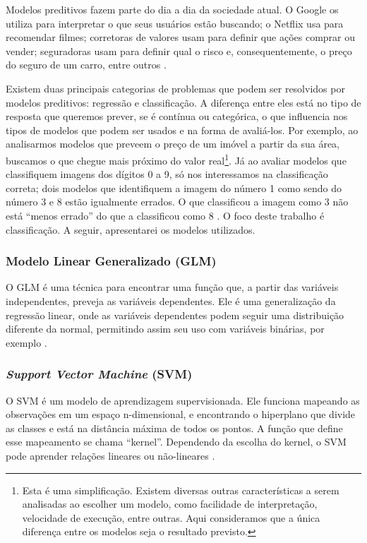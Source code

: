 \documentclass[a4paper,titlepage]{ppgi}\usepackage[]{graphicx}\usepackage[]{color}
\begin{document}
Modelos preditivos fazem parte do dia a dia da sociedade atual. O Google os
utiliza para interpretar o que seus usuários estão buscando; o Netflix usa para
recomendar filmes; corretoras de valores usam para definir que ações comprar ou
vender; seguradoras usam para definir qual o risco e, consequentemente, o preço
do seguro de um carro, entre outros \cite{Levy2010}.

Existem duas principais categorias de problemas que podem ser resolvidos por
modelos preditivos: regressão e classificação. A diferença entre eles está no
tipo de resposta que queremos prever, se é contínua ou categórica, o que
influencia nos tipos de modelos que podem ser usados e na forma de avaliá-los.
Por exemplo, ao analisarmos modelos que preveem o preço de um imóvel a partir
da sua área, buscamos o que chegue mais próximo do valor real\footnote{Esta é
uma simplificação. Existem diversas outras características a serem analisadas
ao escolher um modelo, como facilidade de interpretação, velocidade de
execução, entre outras. Aqui consideramos que a única diferença entre os
modelos seja o resultado previsto.}. Já ao avaliar modelos que classifiquem
imagens dos dígitos 0 a 9, só nos interessamos na classificação correta; dois
modelos que identifiquem a imagem do número 1 como sendo do número 3 e 8 estão
igualmente errados. O que classificou a imagem como 3 não está ``menos errado''
do que a classificou como 8 \cite{Kuhn2013,Zumel2014}. O foco deste trabalho é
classificação. A seguir, apresentarei os modelos utilizados.

\subsubsection{Modelo Linear Generalizado (GLM)}

O \gls{GLM} é uma técnica para encontrar uma função que, a partir das variáveis
independentes, preveja as variáveis dependentes. Ele é uma generalização da
regressão linear, onde as variáveis dependentes podem seguir uma
distribuição diferente da normal, permitindo assim seu uso com variáveis
binárias, por exemplo \cite{Kuhn2013}.

\subsubsection{\emph{Support Vector Machine} (SVM)}

O \gls{SVM} é um modelo de aprendizagem supervisionada. Ele funciona mapeando
as observações em um espaço n-dimensional, e encontrando o hiperplano que divide
as classes e está na distância máxima de todos os pontos. A função que
define esse mapeamento se chama ``kernel''. Dependendo da escolha do kernel, o
\gls{SVM} pode aprender relações lineares ou não-lineares \cite{Kuhn2013}.
\end{document}
